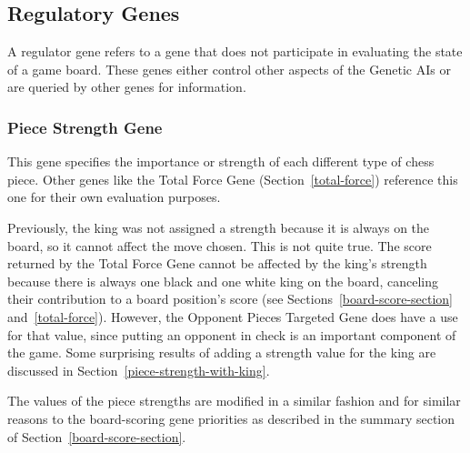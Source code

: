 \documentclass[letterpaper]{article}
\renewcommand{\_}{\allowbreak\textunderscore\allowbreak}
\begin{document}
\subsection{Regulatory Genes}
A regulator gene refers to a gene that does not participate in evaluating the state of a game board. These genes either control other aspects of the Genetic AIs or are queried by other genes for information.

\subsubsection{Piece Strength Gene}\label{piece-strength}
This gene specifies the importance or strength of each different type of chess piece. Other genes like the Total Force Gene (Section~\ref{total-force}) reference this one for their own evaluation purposes.

Previously, the king was not assigned a strength because it is always on the board, so it cannot affect the move chosen. This is not quite true. The score returned by the Total Force Gene cannot be affected by the king's strength because there is always one black and one white king on the board, canceling their contribution to a board position's score (see Sections~\ref{board-score-section} and~\ref{total-force}). However, the Opponent Pieces Targeted Gene does have a use for that value, since putting an opponent in check is an important component of the game. Some surprising results of adding a strength value for the king are discussed in Section~\ref{piece-strength-with-king}.

The values of the piece strengths are modified in a similar fashion and for similar reasons to the board-scoring gene priorities as described in the summary section of Section~\ref{board-score-section}.
\end{document}
